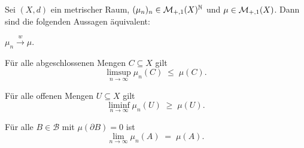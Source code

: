 \documentclass[../main/main.tex]{subfiles}
\begin{document}
	\begin{Satz}[Portmanteau]
		\label{thm:portmanteau}
		Sei $(X, d)$ ein metrischer Raum, $(\mu_n)_n \in \mathcal{M}_{+,1}(X)^{\mathbb{N}}$ 
		und $\mu \in \mathcal{M}_{+,1}(X)$. Dann sind die folgenden Aussagen äquivalent:
		\begin{equivalentthm}
			\item $\mu_n \xrightarrow{w} \mu$.
			\item Für alle abgeschlossenen Mengen $C \subseteq X$ gilt 
				$$\limsup_{n \to \infty} \mu_n(C) \; \leq \; \mu(C) \text{.}$$
			\item Für alle offenen Mengen $U \subseteq X$ gilt 
				$$\liminf_{n \to \infty} \mu_n(U) \; \geq \; \mu(U) \text{.}$$
			\item Für alle $B \in \mathcal{B}$ mit $\mu(\partial B) = 0$ 
				ist $$\lim_{n \to \infty} \mu_n(A) \; = \; \mu(A) \text{.}$$
		\end{equivalentthm}
	\end{Satz}
\end{document}
